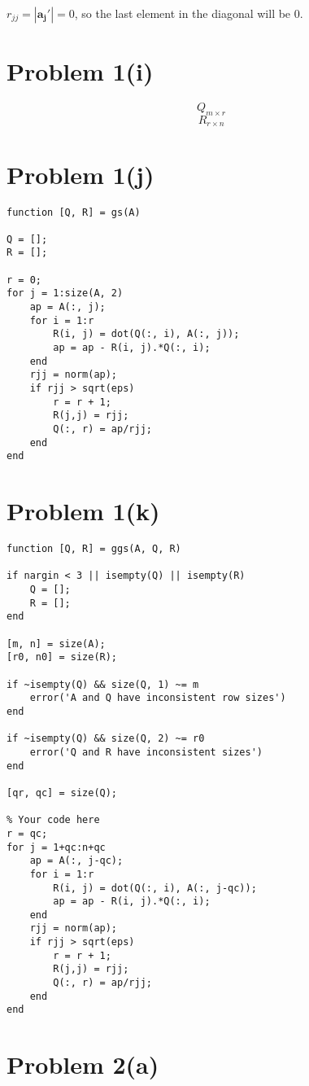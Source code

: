\documentclass{article}
\begin{document}
$r_{jj} = |\mathbf{a_j'}| = 0$, so the last element in the diagonal will be 0.

\section*{Problem 1(i)}

$$Q_{m \times r}$$
$$R_{r \times n}$$

\section*{Problem 1(j)}

\begin{verbatim}
function [Q, R] = gs(A)

Q = [];
R = [];

r = 0;
for j = 1:size(A, 2)
    ap = A(:, j);
    for i = 1:r
        R(i, j) = dot(Q(:, i), A(:, j));
        ap = ap - R(i, j).*Q(:, i);
    end
    rjj = norm(ap);
    if rjj > sqrt(eps)
        r = r + 1;
        R(j,j) = rjj;
        Q(:, r) = ap/rjj;
    end
end
\end{verbatim}

\section*{Problem 1(k)}

\begin{verbatim}
function [Q, R] = ggs(A, Q, R)

if nargin < 3 || isempty(Q) || isempty(R)
    Q = [];
    R = [];
end

[m, n] = size(A);
[r0, n0] = size(R);

if ~isempty(Q) && size(Q, 1) ~= m
    error('A and Q have inconsistent row sizes')
end

if ~isempty(Q) && size(Q, 2) ~= r0
    error('Q and R have inconsistent sizes')
end

[qr, qc] = size(Q);

% Your code here
r = qc;
for j = 1+qc:n+qc
    ap = A(:, j-qc);
    for i = 1:r
        R(i, j) = dot(Q(:, i), A(:, j-qc));
        ap = ap - R(i, j).*Q(:, i);
    end
    rjj = norm(ap);
    if rjj > sqrt(eps)
        r = r + 1;
        R(j,j) = rjj;
        Q(:, r) = ap/rjj;
    end
end
\end{verbatim}

\section*{Problem 2(a)}
\end{document}
